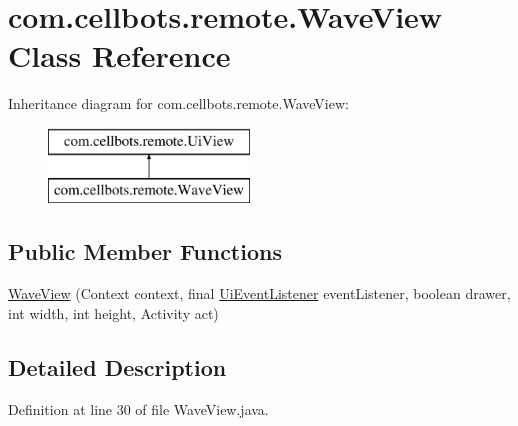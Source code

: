 \hypertarget{classcom_1_1cellbots_1_1remote_1_1_wave_view}{\section{com.\-cellbots.\-remote.\-Wave\-View Class Reference}
\label{classcom_1_1cellbots_1_1remote_1_1_wave_view}
}
Inheritance diagram for com.\-cellbots.\-remote.\-Wave\-View\-:\begin{figure}[H]
\begin{center}
\leavevmode
\includegraphics[height=2.000000cm]{classcom_1_1cellbots_1_1remote_1_1_wave_view}
\end{center}
\end{figure}
\subsection*{Public Member Functions}
\begin{DoxyCompactItemize}
\item 
\hyperlink{classcom_1_1cellbots_1_1remote_1_1_wave_view_a94645bdc3c58381d509c3975eaad9315}{Wave\-View} (Context context, final \hyperlink{interfacecom_1_1cellbots_1_1remote_1_1_ui_view_1_1_ui_event_listener}{Ui\-Event\-Listener} event\-Listener, boolean drawer, int width, int height, Activity act)
\end{DoxyCompactItemize}


\subsection{Detailed Description}


Definition at line 30 of file Wave\-View.\-java.



